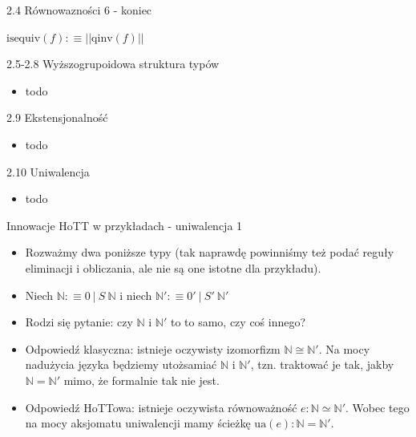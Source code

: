 \documentclass{beamer}
\newcommand{\qinv}{\text{qinv}}
\newcommand{\isequiv}{\text{isequiv}}
\begin{document}
\begin{frame}{2.4 Równowazności 6 - koniec}

\begin{definition}[Równoważność 4]
$
\displaystyle
	\isequiv(f) :\equiv ||\qinv(f)||
$
\end{definition}

\end{frame}

\begin{frame}{2.5-2.8 Wyższogrupoidowa struktura typów}
\begin{itemize}
	\item todo
\end{itemize}
\end{frame}

\begin{frame}{2.9 Ekstensjonalność}
\begin{itemize}
	\item todo
\end{itemize}
\end{frame}

\begin{frame}{2.10 Uniwalencja}
\begin{itemize}
	\item todo
\end{itemize}
\end{frame}

\begin{frame}{Innowacje HoTT w przykładach - uniwalencja 1}
\begin{itemize}
	\item Rozważmy dwa poniższe typy (tak naprawdę powinniśmy też podać reguły eliminacji i obliczania, ale nie są one istotne dla przykładu).
	\item Niech $\mathbb{N} :\equiv 0 \: | \: S\ \mathbb{N}$ i niech $\mathbb{N}' :\equiv 0' \: | \: S'\ \mathbb{N}'$
	\item Rodzi się pytanie: czy $\mathbb{N}$ i $\mathbb{N}'$ to to samo, czy coś innego?
	\item Odpowiedź klasyczna: istnieje oczywisty izomorfizm $\mathbb{N} \cong \mathbb{N}'$. Na mocy nadużycia języka będziemy utożsamiać $\mathbb{N}$ i $\mathbb{N}'$, tzn. traktować je tak, jakby $\mathbb{N} = \mathbb{N}'$ mimo, że formalnie tak nie jest.
	\item Odpowiedź HoTTowa: istnieje oczywista równoważność $e : \mathbb{N} \simeq \mathbb{N}'$. Wobec tego na mocy aksjomatu uniwalencji mamy ścieżkę $\text{ua}(e) : \mathbb{N} = \mathbb{N}'$.
\end{itemize}
\end{frame}
\end{document}

